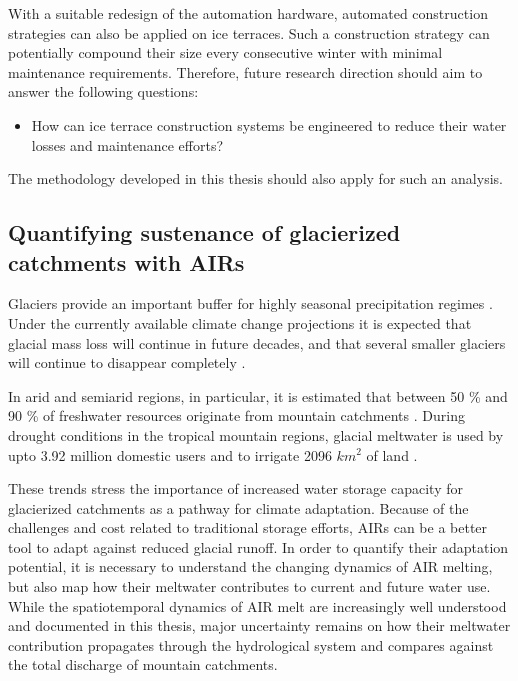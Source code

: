 With a suitable redesign of the automation hardware, automated construction strategies can also be applied on
ice terraces. Such a construction strategy can potentially compound their size every consecutive winter with
minimal maintenance requirements. Therefore, future research direction should aim to answer the following
questions:

\begin{itemize}

  \item How can ice terrace construction systems be engineered to reduce their water losses and maintenance
    efforts?

\end{itemize}

The methodology developed in this thesis should also apply for such an analysis.

\subsection{Quantifying sustenance of glacierized catchments with AIRs}

Glaciers provide an important buffer for highly seasonal precipitation regimes
\citep{kaserContributionPotentialGlaciers2010}. Under the currently available climate change projections it is
expected that glacial mass loss will continue in future decades, and that several smaller glaciers will continue
to disappear completely \citep{rabatelCurrentStateGlaciers2013}. 

In arid and semiarid regions, in particular, it is estimated that between 50 \% and 90 \% of freshwater
resources originate from mountain catchments \citep{messerliMountainsWorldVulnerable2004}. During drought
conditions in the tropical mountain regions, glacial meltwater is used by upto 3.92 million domestic users and
to irrigate 2096 $km^2$ of land \citep{buytaertGlacialMeltContent2017}.  

These trends stress the importance of increased water storage capacity for glacierized catchments as a pathway
for climate adaptation. Because of the challenges and cost related to traditional storage efforts, AIRs can be
a better tool to adapt against reduced glacial runoff. In order to quantify their adaptation potential, it
is necessary to understand the changing dynamics of AIR melting, but also map how their meltwater contributes to
current and future water use. While the spatiotemporal dynamics of AIR melt are increasingly well understood and
documented in this thesis, major uncertainty remains on how their meltwater contribution propagates through the
hydrological system and compares against the total discharge of mountain catchments. 

